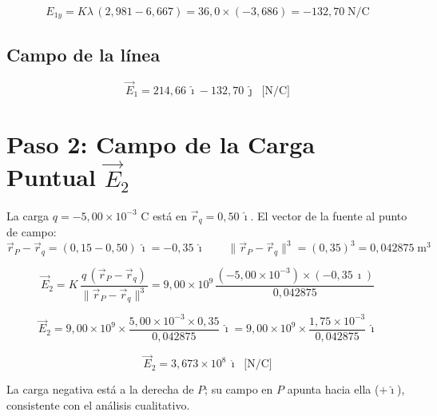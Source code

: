 \documentclass[12pt,letterpaper]{article}
\begin{document}
\begin{equation*}
    E_{1y} = K\lambda\,(2{,}981 - 6{,}667) = 36{,}0\times(-3{,}686) = -132{,}70\;\text{N/C}
\end{equation*}

\subsection*{Campo de la l\'inea}

\begin{equation*}
    \vec{E}_1 = 214{,}66\,\hat{\imath} - 132{,}70\,\hat{\jmath}\;\;\text{[N/C]}
\end{equation*}

\section*{Paso 2: Campo de la Carga Puntual $\vec{E}_2$}

La carga $q = -5{,}00\times10^{-3}$ C est\'a en $\vec{r}_q = 0{,}50\,\hat{\imath}$. El vector de la fuente al punto de campo:
\begin{equation*}
    \vec{r}_P - \vec{r}_q = (0{,}15 - 0{,}50)\,\hat{\imath} = -0{,}35\,\hat{\imath}
    \qquad
    \|\vec{r}_P - \vec{r}_q\|^3 = (0{,}35)^3 = 0{,}042875\;\text{m}^3
\end{equation*}

\begin{equation*}
    \vec{E}_2
    = K\,\frac{q\,(\vec{r}_P - \vec{r}_q)}{\|\vec{r}_P - \vec{r}_q\|^3}
    = 9{,}00\times10^9\,\frac{(-5{,}00\times10^{-3})\times(-0{,}35\,\hat{\imath})}{0{,}042875}
\end{equation*}

\begin{equation*}
    \vec{E}_2
    = 9{,}00\times10^9\times\frac{5{,}00\times10^{-3}\times0{,}35}{0{,}042875}\,\hat{\imath}
    = 9{,}00\times10^9\times\frac{1{,}75\times10^{-3}}{0{,}042875}\,\hat{\imath}
\end{equation*}

\begin{equation*}
    \boxed{\vec{E}_2 = 3{,}673\times10^{8}\,\hat{\imath}\;\;\text{[N/C]}}
\end{equation*}

La carga negativa est\'a a la derecha de $P$; su campo en $P$ apunta hacia ella ($+\hat{\imath}$), consistente con el an\'alisis cualitativo.
\end{document}
